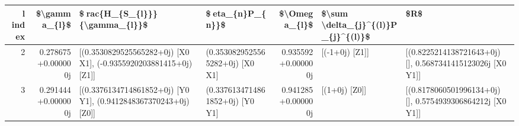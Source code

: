 \begin{tabular}{rrllrll}
\toprule
 l index &        \$\textbackslash gamma\_\{l\}\$ &                                     \$rac\{H\_\{S\_\{l\}\}\}\{\textbackslash gamma\_\{l\}\}\$ &                 \$eta\_\{n\}P\_\{n\}\}\$ &        \$\textbackslash Omega\_\{l\}\$ & \$\textbackslash sum \textbackslash delta\_\{j\}\textasciicircum \{(l)\}P\_\{j\}\textasciicircum \{(l)\}\$ &                                                        \$R\$ \\
\midrule
       2 &  0.278675+0.000000j &  [(0.3530829525565282+0j) [X0 X1], (-0.9355920203881415+0j) [Z1]] &  (0.3530829525565282+0j) [X0 X1] &  0.935592+0.000000j &                     [(-1+0j) [Z1]] &  [(0.8225214138721643+0j) [], 0.5687341415123026j [X0 Y1]] \\
       3 &  0.291444+0.000000j &   [(0.3376134714861852+0j) [Y0 Y1], (0.9412848367370243+0j) [Z0]] &  (0.3376134714861852+0j) [Y0 Y1] &  0.941285+0.000000j &                      [(1+0j) [Z0]] &  [(0.8178060501996134+0j) [], 0.5754939306864212j [X0 Y1]] \\
\bottomrule
\end{tabular}
